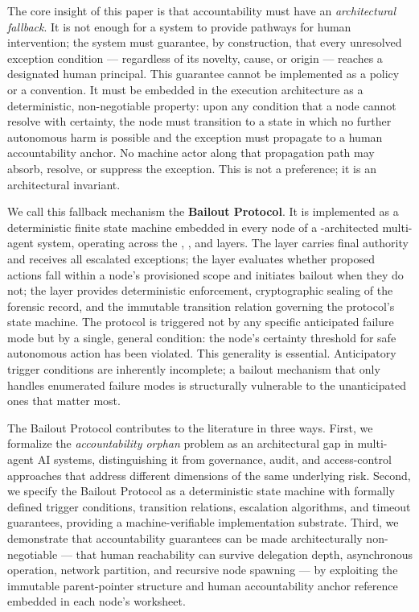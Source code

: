 The core insight of this paper is that accountability must have an \emph{architectural fallback}. It is not enough for a system to provide pathways for human intervention; the system must guarantee, by construction, that every unresolved exception condition — regardless of its novelty, cause, or origin — reaches a designated human principal. This guarantee cannot be implemented as a policy or a convention. It must be embedded in the execution architecture as a deterministic, non-negotiable property: upon any condition that a node cannot resolve with certainty, the node must transition to a state in which no further autonomous harm is possible and the exception must propagate to a human accountability anchor. No machine actor along that propagation path may absorb, resolve, or suppress the exception. This is not a preference; it is an architectural invariant.

We call this fallback mechanism the \textbf{Bailout Protocol}. It is implemented as a deterministic finite state machine embedded in every node of a \bxthree{}-architected multi-agent system, operating across the \purpose{}, \bounds{}, and \fact{} layers. The \purpose{} layer carries final authority and receives all escalated exceptions; the \bounds{} layer evaluates whether proposed actions fall within a node's provisioned scope and initiates bailout when they do not; the \fact{} layer provides deterministic enforcement, cryptographic sealing of the forensic record, and the immutable transition relation governing the protocol's state machine. The protocol is triggered not by any specific anticipated failure mode but by a single, general condition: the node's certainty threshold for safe autonomous action has been violated. This generality is essential. Anticipatory trigger conditions are inherently incomplete; a bailout mechanism that only handles enumerated failure modes is structurally vulnerable to the unanticipated ones that matter most.

The Bailout Protocol contributes to the literature in three ways. First, we formalize the \emph{accountability orphan} problem as an architectural gap in multi-agent AI systems, distinguishing it from governance, audit, and access-control approaches that address different dimensions of the same underlying risk. Second, we specify the Bailout Protocol as a deterministic state machine with formally defined trigger conditions, transition relations, escalation algorithms, and timeout guarantees, providing a machine-verifiable implementation substrate. Third, we demonstrate that accountability guarantees can be made architecturally non-negotiable — that human reachability can survive delegation depth, asynchronous operation, network partition, and recursive node spawning — by exploiting the immutable parent-pointer structure and human accountability anchor reference embedded in each node's worksheet.


